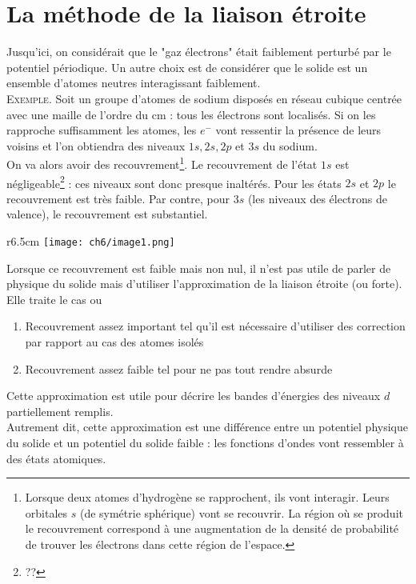 \chapter{La méthode de la liaison étroite}
Jusqu'ici, on considérait que le "gaz électrons" était faiblement perturbé 
par le potentiel périodique. Un autre choix est de considérer que le solide 
est un ensemble d'atomes neutres interagissant faiblement.\\
\textsc{Exemple.} Soit un groupe d'atomes de sodium disposés en réseau 
cubique centrée avec une maille de l'ordre du cm : tous les électrons sont 
localisés. Si on les rapproche suffisamment les atomes, les $e^-$ vont ressentir 
la présence de leurs voisins et l'on obtiendra des niveaux $1s,2s,2p$ et $3s$ 
du sodium.\\

On va alors avoir des recouvrement\footnote{Lorsque deux atomes d'hydrogène se 
rapprochent, ils vont interagir. Leurs orbitales $s$ (de symétrie sphérique) vont 
se recouvrir. La région où se produit le recouvrement correspond à une augmentation 
de la densité de probabilité de trouver les électrons dans cette région de l'espace.}. 
Le recouvrement de l'état $1s$ est négligeable\footnote{??} : ces niveaux sont donc 
presque inaltérés. Pour les états $2s$ et $2p$ le recouvrement est très faible. Par 
contre, pour $3s$ (les niveaux des électrons de valence), le recouvrement est 
substantiel.\\
	\begin{wrapfigure}[14]{r}{6.5cm}
	\vspace{-0.5cm}
	\texttt{[image: ch6/image1.png]}
	\end{wrapfigure}		
Lorsque ce recouvrement est faible mais non nul, il n'est pas utile de parler de 
physique du solide mais d'utiliser l'approximation de la liaison étroite (ou 
forte). Elle traite le cas ou
\begin{enumerate}
\item Recouvrement assez important tel qu'il est nécessaire d'utiliser des correction 
par rapport au cas des atomes isolés
\item Recouvrement assez faible tel pour ne pas tout rendre absurde
\end{enumerate}
Cette approximation est utile pour décrire les bandes d'énergies des niveaux $d$ 
partiellement remplis.\\
Autrement dit, cette approximation est une différence entre un potentiel physique du 
solide et un potentiel du solide faible : les fonctions d'ondes vont ressembler à des 
états atomiques.


